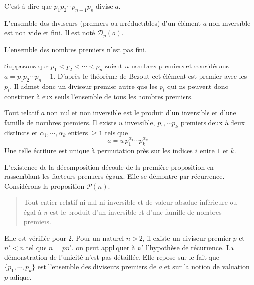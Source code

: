 \begin{propn}
\begin{demo}
\begin{displaymath}
\end{displaymath}
C'est à dire que $p_1p_2\cdots p_{n-1} p_n$ divise $a$.
\end{demo}
\begin{nota}
L'ensemble des diviseurs (premiers ou irréductibles) d'un élément $a$ non inversible est non vide et fini. Il est noté $\mathcal D_p(a)$. 
\end{nota}
\begin{prop}
L'ensemble des nombres premiers n'est pas fini. 
\end{prop}
\begin{demo}
 Supposons que $p_1<p_2<\cdots<p_n$ soient $n$ nombres premiers  et considérons $a=p_1p_2\cdots p_n+1$. D'après le théorème de Bezout cet élément est premier avec les $p_i$. Il admet donc un diviseur premier autre que les $p_i$ qui ne peuvent donc constituer à eux seuls l'ensemble de tous les nombres premiers. 
\end{demo}
\begin{prop}
Tout relatif $a$ non nul et non inversible est le produit d'un inversible et d'une famille de nombres premiers.\newline 
 Il existe  $u$ inversible, $p_1,\cdots p_k$ premiers deux à deux distincts et $\alpha_1,\cdots,\alpha_k$ entiers $\geq 1$ tels que
\begin{displaymath}
 a = u \, p_1^{\alpha_1} \cdots p_k^{\alpha_k} 
\end{displaymath}
Une telle écriture est unique à permutation près sur les indices $i$ entre $1$ et $k$.
\end{prop}
\begin{demo}
 L'existence de la décomposition découle de la première proposition en rassemblant les facteurs premiers égaux. Elle se démontre par récurrence.\newline
Considérons la proposition $\mathcal{P}(n)$.
\begin{quote}
  Tout entier relatif ni nul ni inversible et de valeur absolue inférieure ou égal à $n$ est le produit d'un inversible et d'une famille de nombres premiers.
\end{quote}
Elle est vérifiée pour $2$. Pour un naturel $n>2$, il existe un diviseur premier $p$ et $n'<n$ tel que $n=pn'$. on peut appliquer à $n'$ l'hypothèse de récurrence.\newline 
La démonstration de l'unicité n'est pas détaillée. Elle repose sur le fait que $\{p_1,\cdots,p_k\}$ est l'ensemble des diviseurs premiers de $a$ et sur la notion de valuation $p$-adique.

\end{demo}
\end{propn}
